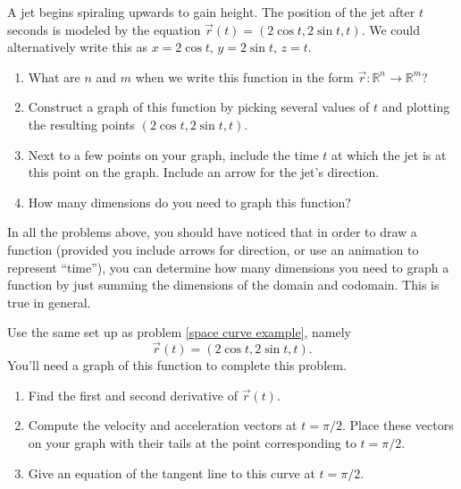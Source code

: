\begin{problem}\label{jet intro for space curves}%
\label{space curve example}%
%
 A jet begins spiraling upwards to gain height. The position of the jet after $t$ seconds is modeled by the equation 
$\vec r(t)=(2\cos t, 2\sin t, t).$ We could alternatively write this as $x=2\cos t,\, y=2\sin t,\, z=t$. 
\begin{enumerate}
 \item What are $n$ and $m$ when we write this function in the form  $\vec r\colon {\mathbb{R}}^n\to {\mathbb{R}}^m$? 
 \item Construct a graph of this function by picking several values of $t$ and plotting the resulting points $(2\cos t, 2\sin t, t)$. 
 \item Next to a few points on your graph, include the time $t$ at which the jet is at this point on the graph. Include an arrow for the jet's direction.
 \item  How many dimensions do you need to graph this function?
\end{enumerate}
\end{problem}

In all the problems above, you should have noticed that in order to draw a function (provided you include arrows for direction, or use an animation to represent ``time''), you can determine how many dimensions you need to graph a function by just summing the dimensions of the domain and codomain. This is true in general.

\begin{problem}%
%
 Use the same set up as problem \ref{space curve example}, namely $$\vec r(t)=(2\cos t, 2\sin t, t).$$  You'll need a graph of this function to complete this problem.
 \begin{enumerate}
  \item Find the first and second derivative of $\vec r(t)$. 
  \item Compute the velocity and acceleration vectors at $t=\pi/2$. Place these vectors on your graph with their tails at the point corresponding to $t=\pi/2$.
  \item Give an equation of the tangent line to this curve at $t=\pi/2$.
 \end{enumerate}
\end{problem}


